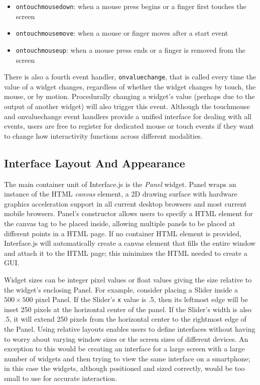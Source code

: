 \begin{itemize}
\item \texttt{ontouchmousedown}: when a mouse press begins or a finger first touches the screen
\item \texttt{ontouchmousemove}:  when a mouse or finger moves after a start event
\item \texttt{ontouchmouseup}:  when a mouse press ends or a finger is removed from the screen
\end{itemize}

There is also a fourth event handler, \texttt{onvaluechange}, that is called every time the value of a widget changes, regardless of whether the widget changes by touch, the mouse, or by motion. Procedurally changing a widget's value (perhaps due to the output of another widget) will also trigger this event. Although the touchmouse and onvaluechange event handlers provide a unified interface for dealing with all events, users are free to register for dedicated mouse or touch events if they want to change how interactivity functions across different modalities.

\subsection{Interface Layout And Appearance}
The main container unit of Interface.js is the \emph{Panel} widget. Panel wraps an instance of the HTML \emph{canvas} element, a 2D drawing surface with hardware graphics acceleration support in all current desktop browsers and most current mobile browsers. Panel's constructor allows users to specify a HTML element for the canvas tag to be placed inside, allowing multiple panels to be placed at different points in a HTML page.  If no container HTML element is provided, Interface.js will automatically create a canvas element that fills the entire window and attach it to the HTML page; this minimizes the HTML needed to create a GUI.

Widget sizes can be integer pixel values or float values giving the size relative to the widget's enclosing Panel. For example, consider placing a Slider inside a $500\times500$ pixel Panel. If the Slider's \texttt{x} value is .5, then its leftmost edge will be inset 250 pixels at the horizontal center of the panel. If the Slider's width is also .5, it will extend 250 pixels from the horizontal center to the rightmost edge of the Panel. Using relative layouts enables users to define interfaces without having to worry about varying window sizes or the screen sizes of different devices. An exception to this would be creating an interface for a large screen with a large number of widgets and then trying to view the same interface on a smartphone; in this case the widgets, although positioned and sized correctly, would be too small to use for accurate interaction.

